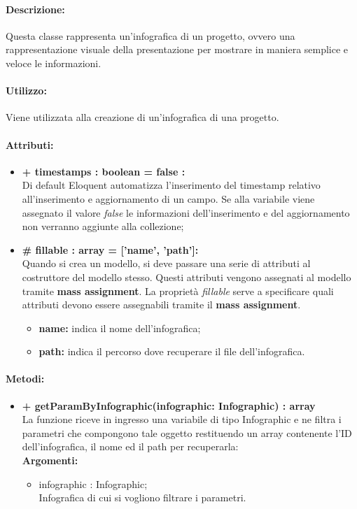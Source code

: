 	\paragraph{Descrizione:}
	Questa classe rappresenta un'\gls{infografica} di un progetto, ovvero una rappresentazione visuale della presentazione per mostrare in maniera semplice e veloce le informazioni.
	
	\paragraph{Utilizzo:}
	Viene utilizzata alla creazione di un'\gls{infografica} di una progetto.

	\paragraph{Attributi:}
		\begin{itemize}
			\item \textbf{+ timestamps : boolean = false :}\\
			Di default Eloquent automatizza l'inserimento del timestamp relativo all'inserimento e aggiornamento di un campo. Se alla variabile viene assegnato il valore \textit{false} le informazioni dell'inserimento e del aggiornamento non verranno aggiunte alla collezione;
			\item \textbf{\# fillable : array = [’name’, ’path’]:}\\
			Quando si crea un modello, si deve passare una serie di attributi al costruttore del modello stesso. Questi attributi vengono assegnati al modello tramite \textbf{mass assignment}. La proprietà \textit{fillable} serve a specificare quali attributi devono essere assegnabili tramite il \textbf{mass assignment}.
			\begin{itemize}
				\item \textbf{name:} indica il nome dell'\gls{infografica};
				\item \textbf{path:} indica il percorso dove recuperare il file dell'\gls{infografica}.
			\end{itemize}
		\end{itemize}
		
	\paragraph{Metodi:}
		\begin{itemize}
			\item \textbf{+ getParamByInfographic(infographic: Infographic) : array}\\
			La funzione riceve in ingresso una variabile di tipo Infographic e ne filtra i parametri che compongono tale oggetto restituendo un array contenente l'ID dell'infografica, il nome ed il path per recuperarla:\\
			\textbf{Argomenti:}
			\begin{itemize}
				\item infographic : Infographic;\\
				Infografica di cui si vogliono filtrare i parametri.
			\end{itemize}
		\end{itemize}
\newpage


